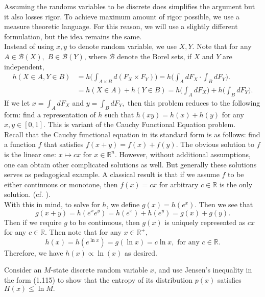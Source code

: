 Assuming the randoms variables to be discrete does simplifies the
argument but it also losses rigor. To achieve maximum amount of rigor
possible, we use a measure theoretic language. For this reason, we
will use a slightly different formulation, but the idea remains the
same. \medskip\\
Instead of using $x,y$ to denote random variable, we use $X,Y$.
Note that for any $A\in\mathcal{B}(X),$ $B\in\mathcal{B}(Y)$, where
$\mathcal{B}$ denote the Borel sets, if $X$ and $Y$ are independent,
\begin{align*}
h(X\in A,Y\in B) & =h\bigg(\int_{A\times B}d(F_{X}\times F_{Y})\bigg)=h\bigg(\int_{A}dF_{X}\cdot\int_{B}dF_{Y}\bigg).\tag{by independence}\\
 & =h(X\in A)+h(Y\in B)=h\bigg(\int_{A}dF_{X}\bigg)+h\bigg(\int_{B}dF_{Y}\bigg).
\end{align*}
If we let $x=\int_{A}dF_{X}$ and $y=\int_{B}dF_{Y},$ then this problem
reduces to the following form: find a representation of $h$ such
that $h(xy)=h(x)+h(y)$ for any $x,y\in[0,1].$ This is variant of
the Cauchy Functional Equation problem. \medskip\\
Recall that the Cauchy functional equation in its standard form is
as follows: find a function $f$ that satisfies $f(x+y)=f(x)+f(y).$
The obvious solution to $f$ is the linear one: $x\mapsto cx$ for
$x\in\mathbb{R}^{n}.$ However, without additional assumptions, one
can obtain other complicated solutions as well. But generally these
solutions serves as pedagogical example. A classical result is that
if we assume $f$ to be either continuous or monotone, then $f(x)=cx$
for arbitrary $c\in\mathbb{R}$ is the only solution. (cf. \cite{kuczma2009an}).
\medskip\\
With this in mind, to solve for $h$, we define $g(x)=h(e^{x}).$
Then we see that 
\[
g(x+y)=h(e^{x}e^{y})=h(e^{x})+h(e^{y})=g(x)+g(y).
\]
Then if we require $g$ to be continuous, then $g(x)$ is uniquely
represented as $cx$ for any $c\in\mathbb{R}.$ Then note that for
any $x\in\mathbb{R}^{+},$ 
\[
h(x)=h(e^{\ln x})=g(\ln x)=c\ln x,\text{ for any }c\in\mathbb{R}.
\]
Therefore, we have $h(x)\propto\ln(x)$ as desired. \\

\begin{cBoxA}{}
 Consider an $M$-state discrete random variable $x$, and use Jensen\textquoteright s
inequality in the form (1.115) to show that the entropy of its distribution
$p(x)$ satisfies $H(x)\leq\ln M.$
\end{cBoxA}

